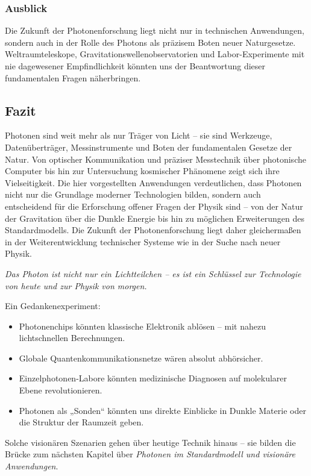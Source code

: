 \subsubsection{Ausblick}

Die Zukunft der Photonenforschung liegt nicht nur in technischen Anwendungen, sondern auch in der Rolle des Photons als präzisem Boten neuer Naturgesetze. 
Weltraumteleskope, Gravitationswellenobservatorien und Labor-Experimente mit nie dagewesener Empfindlichkeit könnten uns der Beantwortung dieser fundamentalen Fragen näherbringen.

\subsection{Fazit}

Photonen sind weit mehr als nur Träger von Licht – sie sind Werkzeuge, Datenüberträger, Messinstrumente und Boten der fundamentalen Gesetze der Natur. 
Von optischer Kommunikation und präziser Messtechnik über photonische Computer bis hin zur Untersuchung kosmischer Phänomene zeigt sich ihre Vielseitigkeit. 
Die hier vorgestellten Anwendungen verdeutlichen, dass Photonen nicht nur die Grundlage moderner Technologien bilden, sondern auch entscheidend für die Erforschung offener Fragen der Physik sind – von der Natur der Gravitation über die Dunkle Energie bis hin zu möglichen Erweiterungen des Standardmodells. 
Die Zukunft der Photonenforschung liegt daher gleichermaßen in der Weiterentwicklung technischer Systeme wie in der Suche nach neuer Physik.

\medskip
\emph{Das Photon ist nicht nur ein Lichtteilchen – es ist ein Schlüssel zur Technologie von heute und zur Physik von morgen.}
\vspace{1em}
\begin{tcolorbox}[hypobox, title={Was wäre, wenn wir Photonen völlig kontrollieren könnten?}]
	\label{box:hypo_kapVII}
	Ein Gedankenexperiment: 
	\begin{itemize}
		\item Photonenchips könnten klassische Elektronik ablösen – mit nahezu lichtschnellen Berechnungen.
		\item Globale Quantenkommunikationsnetze wären absolut abhörsicher.
		\item Einzelphotonen-Labore könnten medizinische Diagnosen auf molekularer Ebene revolutionieren.
		\item Photonen als „Sonden“ könnten uns direkte Einblicke in Dunkle Materie oder die Struktur der Raumzeit geben.
	\end{itemize}
	\medskip
	Solche visionären Szenarien gehen über heutige Technik hinaus – sie bilden die Brücke zum nächsten Kapitel über \emph{Photonen im Standardmodell und visionäre Anwendungen}.
\end{tcolorbox}
